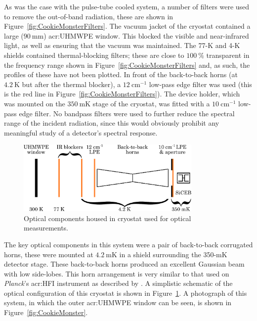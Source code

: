As was the case with the pulse-tube cooled system, a number of filters were used to remove the out-of-band radiation, these are shown in Figure~\ref{fig:CookieMonsterFilters}. The vacuum jacket of the cryostat contained a large ($90~\mathrm{mm}$) \gls{acr:UHMWPE} window. This blocked the visible and near-infrared light, as well as ensuring that the vacuum was maintained. The 77-K and 4-K shields contained thermal-blocking filters; these are close to $100~\%$ transparent in the frequency range shown in Figure~\ref{fig:CookieMonsterFilters} and, as such, the profiles of these have not been plotted. In front of the back-to-back horns (at $4.2~\mathrm{K}$ but after the thermal blocker), a $12~\mathrm{cm}^{-1}$ low-pass edge filter was used (this is the red line in Figure~\ref{fig:CookieMonsterFilters}). The device holder, which was mounted on the $350~\mathrm{mK}$ stage of the cryostat, was fitted with a $10~\mathrm{cm}^{-1}$ low-pass edge filter. No bandpass filters were used to further reduce the spectral range of the incident radiation, since this would obviously prohibit any meaningful study of a detector's spectral response.
\begin{figure}[tb]
\begin{center}
\includegraphics[width = 0.8\textwidth]{figures/CookieMonsterOptics}
\caption[Optical components housed in cryostat used for optical measurements]{Optical components housed in cryostat used for optical measurements.}
\label{fig:CookieMonsterOptics}
\end{center}
\end{figure}
\par
The key optical components in this system were a pair of back-to-back corrugated horns, these were mounted at $4.2~\mathrm{mK}$ in a shield surrounding the 350-mK detector stage. These back-to-back horns produced an excellent Gaussian beam with low side-lobes. This horn arrangement is very similar to that used on \textit{Planck}'s \gls{acr:HFI} instrument as described by \textcite{Maffei2010}. A simplistic schematic of the optical configuration of this cryostat is shown in Figure~\ref{fig:CookieMonsterOptics}. A photograph of this system, in which the outer \gls{acr:UHMWPE} window can be seen, is shown in Figure~\ref{fig:CookieMonster}. 
